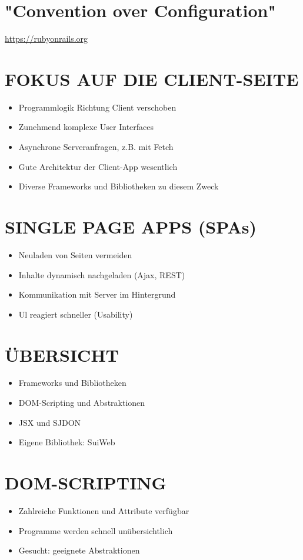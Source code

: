 \section*{"Convention over Configuration"}
\href{https://rubyonrails.org}{https://rubyonrails.org}

\section*{FOKUS AUF DIE CLIENT-SEITE}
\begin{itemize}
  \item Programmlogik Richtung Client verschoben
  \item Zunehmend komplexe User Interfaces
  \item Asynchrone Serveranfragen, z.B. mit Fetch
  \item Gute Architektur der Client-App wesentlich
  \item Diverse Frameworks und Bibliotheken zu diesem Zweck
\end{itemize}

\section*{SINGLE PAGE APPS (SPAs)}
\begin{itemize}
  \item Neuladen von Seiten vermeiden
  \item Inhalte dynamisch nachgeladen (Ajax, REST)
  \item Kommunikation mit Server im Hintergrund
  \item Ul reagiert schneller (Usability)
\end{itemize}

\section*{ÜBERSICHT}
\begin{itemize}
  \item Frameworks und Bibliotheken
  \item DOM-Scripting und Abstraktionen
  \item JSX und SJDON
  \item Eigene Bibliothek: SuiWeb
\end{itemize}

\section*{DOM-SCRIPTING}
\begin{itemize}
  \item Zahlreiche Funktionen und Attribute verfügbar
  \item Programme werden schnell unübersichtlich
  \item Gesucht: geeignete Abstraktionen
\end{itemize}


